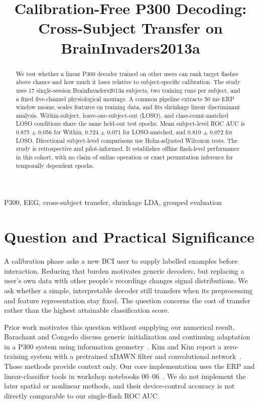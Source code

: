 \documentclass[conference]{IEEEtran}
\title{Calibration-Free P300 Decoding:\\Cross-Subject Transfer on BrainInvaders2013a}
\author{\IEEEauthorblockN{Birzhan Zhunusbekov, Arman Abakov, Nazerke Khamzina, Bekmurat Amangeldiyev}\IEEEauthorblockA{ROBT613 Midterm Project}}
\begin{document}
\maketitle
\begin{abstract}
We test whether a linear P300 decoder trained on other users can rank target flashes
above chance and how much it loses relative to subject-specific calibration.
The study uses 17 single-session BrainInvaders2013a subjects, two training runs per
subject, and a fixed five-channel physiological montage. A common pipeline extracts
50 ms ERP window means, scales features on training data, and fits shrinkage linear
discriminant analysis. Within-subject, leave-one-subject-out (LOSO), and class-count-matched
LOSO conditions share the same held-out test epochs. Mean subject-level ROC AUC is
0.875 $\pm$ 0.056 for Within, 0.724 $\pm$ 0.071 for LOSO-matched, and 0.810 $\pm$ 0.072 for LOSO.
Directional subject-level comparisons use Holm-adjusted Wilcoxon tests.
The study is retrospective and pilot-informed. It establishes offline flash-level
performance in this cohort, with no claim of online operation or exact permutation
inference for temporally dependent epochs.
\end{abstract}
\begin{IEEEkeywords}P300, EEG, cross-subject transfer, shrinkage LDA, grouped evaluation\end{IEEEkeywords}

\section{Question and Practical Significance}
A calibration phase asks a new BCI user to supply labelled examples before interaction.
Reducing that burden motivates generic decoders, but replacing a user's own data with
other people's recordings changes signal distributions. We ask whether a simple,
interpretable decoder still transfers when its preprocessing and feature representation
stay fixed. The question concerns the cost of transfer rather than the highest attainable
classification score.

Prior work motivates this question without supplying our numerical result. Barachant and
Congedo discuss generic initialization and continuing adaptation in a P300 system using
information geometry~\cite{barachant}. Kim and Kim report a zero-training system with a
pretrained xDAWN filter and convolutional network~\cite{kim}. Those methods provide
context only. Our core implementation uses the ERP and linear-classifier tools in
workshop notebooks 00--06~\cite{workshop}. We do not implement the later spatial or
nonlinear methods, and their device-control accuracy is not directly comparable to our
single-flash ROC AUC.
\end{document}
